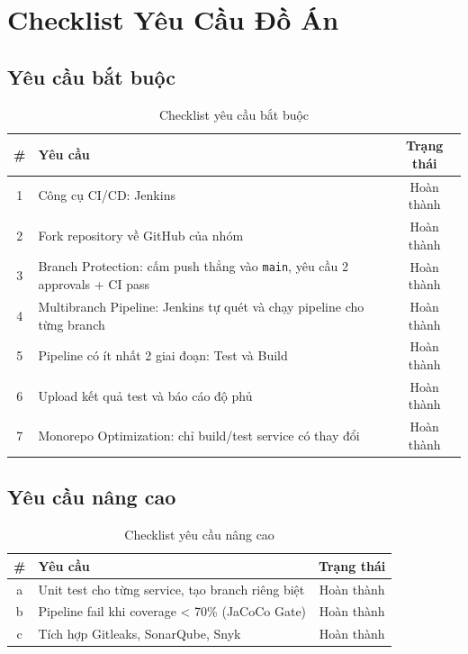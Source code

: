 \section{Checklist Yêu Cầu Đồ Án}

\subsection{Yêu cầu bắt buộc}

\begin{table}[H]
\centering
\caption{Checklist yêu cầu bắt buộc}
\begin{tabular}{|c|p{10cm}|c|}
\hline
\textbf{\#} & \textbf{Yêu cầu} & \textbf{Trạng thái} \\
\hline
1 & Công cụ CI/CD: Jenkins & Hoàn thành \\
\hline
2 & Fork repository về GitHub của nhóm & Hoàn thành \\
\hline
3 & Branch Protection: cấm push thẳng vào \texttt{main}, yêu cầu 2 approvals + CI pass & Hoàn thành \\
\hline
4 & Multibranch Pipeline: Jenkins tự quét và chạy pipeline cho từng branch & Hoàn thành \\
\hline
5 & Pipeline có ít nhất 2 giai đoạn: Test và Build & Hoàn thành \\
\hline
6 & Upload kết quả test và báo cáo độ phủ & Hoàn thành \\
\hline
7 & Monorepo Optimization: chỉ build/test service có thay đổi & Hoàn thành \\
\hline
\end{tabular}
\end{table}

\subsection{Yêu cầu nâng cao}

\begin{table}[H]
\centering
\caption{Checklist yêu cầu nâng cao}
\begin{tabular}{|c|p{10cm}|c|}
\hline
\textbf{\#} & \textbf{Yêu cầu} & \textbf{Trạng thái} \\
\hline
a & Unit test cho từng service, tạo branch riêng biệt & Hoàn thành \\
\hline
b & Pipeline fail khi coverage < 70\% (JaCoCo Gate) & Hoàn thành \\
\hline
c & Tích hợp Gitleaks, SonarQube, Snyk & Hoàn thành \\
\hline
\end{tabular}
\end{table}

